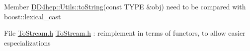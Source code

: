 \label{todo__todo000002}
\hypertarget{todo__todo000002}{}
 
\begin{DoxyDescription}
\item[Member \hyperlink{namespace_d_d4hep_1_1_utils_a30628e1cc5d4a214cc8a33f99b38d466}{DD4hep::Utils::toString}(const TYPE \&obj) ]need to be compared with boost::lexical\_\-cast 
\end{DoxyDescription}

\label{todo__todo000001}
\hypertarget{todo__todo000001}{}
 
\begin{DoxyDescription}
\item[File \hyperlink{_to_stream_8h}{ToStream.h} ]\hyperlink{_to_stream_8h}{ToStream.h} : reimplement in terms of functors, to allow easier especializations 
\end{DoxyDescription}